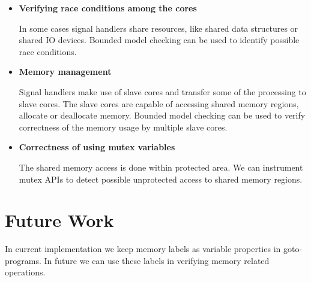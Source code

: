 \begin{itemize}

\item \textbf{Verifying race conditions among the cores}

In some cases signal handlers share resources, like shared data structures or shared IO devices. Bounded model checking can be used to identify possible race conditions.

\item \textbf{Memory management}

Signal handlers make use of slave cores and transfer some of the processing to slave cores. The slave cores are capable of accessing shared memory regions, allocate or deallocate memory. Bounded model checking can be used to verify correctness of the memory usage by multiple slave cores.

\item \textbf{Correctness of using mutex variables}

The shared memory access is done within protected area. We can instrument mutex APIs to detect possible unprotected access to shared memory regions.


\begin{comment}
\item \textbf{Validating parameter of signals}

Signal handlers in the systems work in parallel and perform fixed set of tasks. It often necessary to perform multiple operations on a signal and multiple signal handlers are invoked sequentially. For example, base station can receive a call setup signal in encoded format, one signal handler can perform decoding, next can fetch availability of bandwidth, forwarded it to protocol logic to respond with valid response and initiate call setup procedure. We observed that signals are invoked dynamically and run to completion. We can validate incoming parameters of instrumenting signal handlers.
\end{comment}



\end{itemize}


\chapter{Future Work}

In current implementation we keep memory labels as variable properties in goto-programs. In future we can use these labels in verifying memory related operations.

